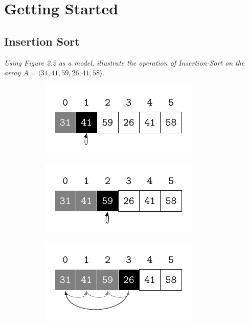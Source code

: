 \section{Getting Started}

\subsection{Insertion Sort}

\begin{description}

   {\itshape Using Figure 2.2 as a model, illustrate the operation of {\sc Insertion-Sort} on the array $A = \langle 31, 41, 59, 26, 41, 58 \rangle$.}

    \begin{ex}
      \begin{figure}[H]
        \centering
        \begin{subfigure}[t]{.45\textwidth}
          \centering
          \includegraphics[scale=1]{img/2_1-1/2_1-1_1.pdf}
          \caption{}\label{fig:2_1-1_1}
        \end{subfigure}
        \begin{subfigure}[t]{.45\textwidth}
          \centering
          \includegraphics[scale=1]{img/2_1-1/2_1-1_2.pdf}
          \caption{}\label{fig:2_1-1_2}
        \end{subfigure}
        \begin{subfigure}[t]{.45\textwidth}
          \centering
          \includegraphics[scale=1]{img/2_1-1/2_1-1_3.pdf}

\end{subfigure}
\end{figure}
\end{ex}
\end{description}
